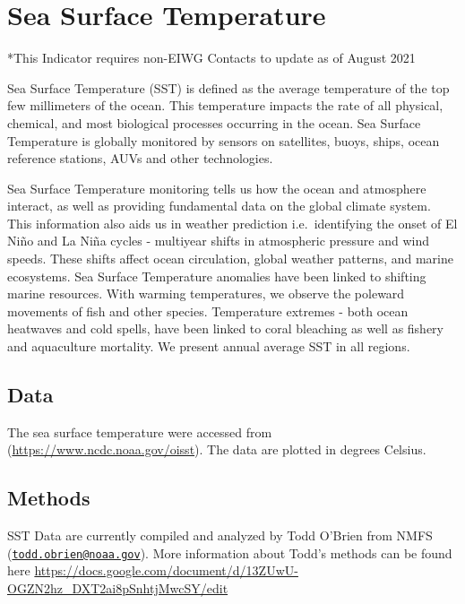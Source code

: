 \documentclass[
]{book}
\begin{document}
\hypertarget{sea-surface-temperature}{%
\chapter{Sea Surface Temperature}\label{sea-surface-temperature}}

*This Indicator requires non-EIWG Contacts to update as of August 2021

Sea Surface Temperature (SST) is defined as the average temperature of the top few millimeters of the ocean. This temperature impacts the rate of all physical, chemical, and most biological processes occurring in the ocean. Sea Surface Temperature is globally monitored by sensors on satellites, buoys, ships, ocean reference stations, AUVs and other technologies.

Sea Surface Temperature monitoring tells us how the ocean and atmosphere interact, as well as providing fundamental data on the global climate system. This information also aids us in weather prediction i.e.~identifying the onset of El Niño and La Niña cycles - multiyear shifts in atmospheric pressure and wind speeds. These shifts affect ocean circulation, global weather patterns, and marine ecosystems. Sea Surface Temperature anomalies have been linked to shifting marine resources. With warming temperatures, we observe the poleward movements of fish and other species. Temperature extremes - both ocean heatwaves and cold spells, have been linked to coral bleaching as well as fishery and aquaculture mortality. We present annual average SST in all regions.

\hypertarget{data-7}{%
\section{Data}\label{data-7}}

The sea surface temperature were accessed from (\url{https://www.ncdc.noaa.gov/oisst}). The data are plotted in degrees Celsius.

\hypertarget{methods-7}{%
\section{Methods}\label{methods-7}}

SST Data are currently compiled and analyzed by Todd O'Brien from NMFS (\href{mailto:todd.obrien@noaa.gov}{\nolinkurl{todd.obrien@noaa.gov}}). More information about Todd's methods can be found here \url{https://docs.google.com/document/d/13ZUwU-OGZN2hz_DXT2ai8pSnhtjMwcSY/edit}
\end{document}
